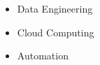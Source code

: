 
\twocolumnsection
{
\begin{skills}
\end{skills}}
{
\vspace{1em}
\begin{itemize}
	\item Data Engineering
	\item Cloud Computing          
    \item Automation
\end{itemize}
}
\vspace{1em}
